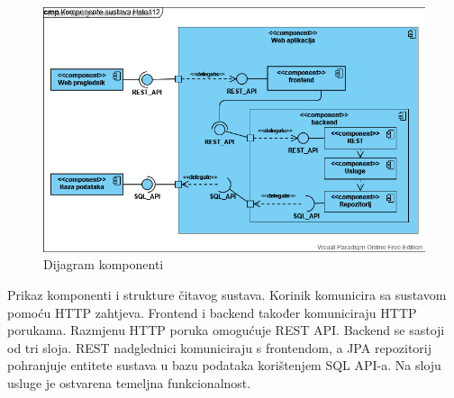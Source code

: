 			\begin{figure}[H]
				\includegraphics[scale=0.6]{slike/cmp.png}
				\centering
				\caption{Dijagram komponenti}
				\label{fig:cmp}
			\end{figure}
			Prikaz komponenti i strukture čitavog sustava. Korinik komunicira sa sustavom pomoću HTTP zahtjeva. Frontend i backend također komuniciraju HTTP porukama. Razmjenu HTTP poruka omogućuje REST API. Backend se sastoji od tri sloja. REST nadglednici komuniciraju s frontendom, a JPA repozitorij pohranjuje entitete sustava u bazu podataka korištenjem SQL API-a. Na sloju usluge je ostvarena temeljna funkcionalnost.